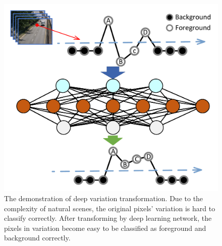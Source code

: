 \documentclass[journal]{IEEEtran}
\begin{document}
\begin{figure}[!t]	%
\centering
    \includegraphics[width=\linewidth]{figure/demo.pdf}
    \caption{The demonstration of deep variation transformation. Due to the complexity of natural scenes, the original pixels' variation is hard to classify correctly. After transforming by deep learning network, the pixels in variation become easy to be classified as foreground and background correctly.}
    \label{idea}
\end{figure}
\end{document}
